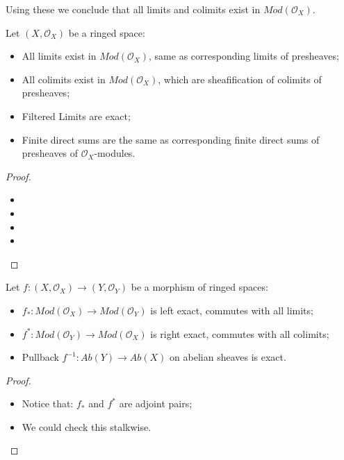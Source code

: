 \documentclass[Total.tex]{subfiles}
\begin{document}
			Using these we conclude that all limits and colimits exist in $Mod(\mathcal{O}_X)$.
			
			\begin{lemma}
				Let $(X,\mathcal{O}_X)$ be a ringed space:
				\begin{itemize}
					\item All limits exist in $Mod(\mathcal{O}_X)$, same as corresponding limits of presheaves;
					\item All colimits exist in $Mod(\mathcal{O}_X)$, which are sheafification of colimits of presheaves;
					\item Filtered Limits are exact;
					\item Finite direct sums are the same as corresponding finite direct sums of presheaves of $\mathcal{O}_X$-modules.
				\end{itemize}
			\end{lemma}
			\begin{proof}
				\begin{itemize}
					\item 
					\item 
					\item 
					\item 
				\end{itemize}
			\end{proof}
			
			\begin{lemma}
				Let $f:(X,\mathcal{O}_X)\rightarrow (Y,\mathcal{O}_Y)$ be a morphism of ringed spaces:
				\begin{itemize}
					\item $f_*:Mod(\mathcal{O}_X)\rightarrow Mod(\mathcal{O}_Y)$ is left exact, commutes with all limits;
					\item $f^*:Mod(\mathcal{O}_Y)\rightarrow Mod(\mathcal{O}_X)$ is right exact, commutes with all colimits;
					\item Pullback $f^{-1}:Ab(Y)\rightarrow Ab(X)$ on abelian sheaves is exact.
				\end{itemize}
			\end{lemma}
			\begin{proof}
				\begin{itemize}
					\item Notice that: $f_*$ and $f^*$ are adjoint pairs;
					\item We could check this stalkwise.
				\end{itemize}
			\end{proof}
			
\end{document}
